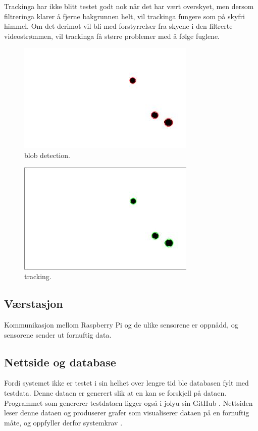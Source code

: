 Trackinga har ikke blitt testet godt nok når det har vært overskyet, men dersom filtreringa klarer å fjerne bakgrunnen helt, vil trackinga fungere som på skyfri himmel. Om det derimot vil bli med forstyrrelser fra skyene i den filtrerte videostrømmen, vil trackinga få større problemer med å følge fuglene.

\begin{figure}[H]
    \centering
    \includegraphics[width=.5\textwidth]{verifikasjon-test/Tracking_ex/blobs1.JPG}
    \caption{blob detection.}
    \label{fig:verifikasjon:blob:1}
\end{figure}
\begin{figure}[H]
    \centering
    \includegraphics[width=.5\textwidth]{verifikasjon-test/Tracking_ex/track1.JPG}
    \caption{tracking.}
    \label{fig:verifikasjon:tracking:1}
\end{figure}

\subsection{Værstasjon}\label{sec:verifikasjon:telemetri}
Kommunikasjon mellom Raspberry Pi og de ulike sensorene er oppnådd, og sensorene sender ut fornuftig data. 

\subsection{Nettside og database}\label{sec:verifikasjon:nettside}

Fordi systemet ikke er testet i sin helhet over lengre tid ble databasen fylt med testdata. Denne dataen er generert slik at en kan se forskjell på dataen. Programmet som genererer testdataen ligger også i jolyu sin GitHub \cite{GitHub}. Nettsiden leser denne dataen og produserer grafer som visualiserer dataen på en fornuftig måte, og oppfyller derfor systemkrav . 

